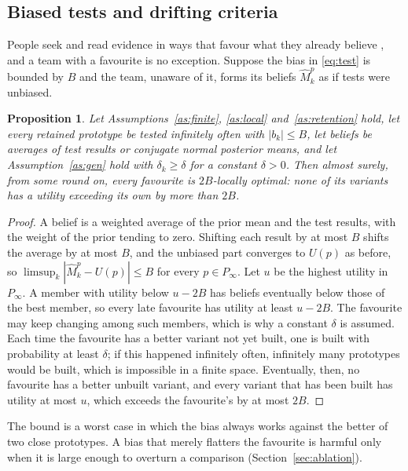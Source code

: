 \documentclass[preprint,review,11pt,authoryear]{elsarticle}
\newtheorem{proposition}{Proposition}
\theoremstyle{definition}
\begin{document}
\subsection{Biased tests and drifting criteria}
\label{sec:bias}

People seek and read evidence in ways that favour what they already believe \citep{nickerson1998}, and a team with a favourite is no exception. Suppose the bias in \eqref{eq:test} is bounded by $B$ and the team, unaware of it, forms its beliefs $\widehat M^p_k$ as if tests were unbiased.

\begin{proposition}
\label{prop:bias}
Let Assumptions~\ref{as:finite}, \ref{as:local} and~\ref{as:retention} hold, let every retained prototype be tested infinitely often with $|b_k|\le B$, let beliefs be averages of test results or conjugate normal posterior means, and let Assumption~\ref{as:gen} hold with $\delta_k\ge\delta$ for a constant $\delta>0$. Then almost surely, from some round on, every favourite is $2B$-locally optimal: none of its variants has a utility exceeding its own by more than $2B$.
\end{proposition}

\begin{proof}
A belief is a weighted average of the prior mean and the test results, with the weight of the prior tending to zero. Shifting each result by at most $B$ shifts the average by at most $B$, and the unbiased part converges to $U(p)$ as before, so $\limsup_k|\widehat M^p_k-U(p)|\le B$ for every $p\in P_\infty$. Let $u$ be the highest utility in $P_\infty$. A member with utility below $u-2B$ has beliefs eventually below those of the best member, so every late favourite has utility at least $u-2B$. The favourite may keep changing among such members, which is why a constant $\delta$ is assumed. Each time the favourite has a better variant not yet built, one is built with probability at least $\delta$; if this happened infinitely often, infinitely many prototypes would be built, which is impossible in a finite space. Eventually, then, no favourite has a better unbuilt variant, and every variant that has been built has utility at most $u$, which exceeds the favourite's by at most $2B$.
\end{proof}

The bound is a worst case in which the bias always works against the better of two close prototypes. A bias that merely flatters the favourite is harmful only when it is large enough to overturn a comparison (Section~\ref{sec:ablation}).
\end{document}
